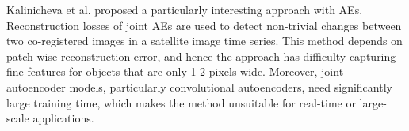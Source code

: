 \documentclass[journal,article,submit,pdftex,moreauthors]{Definitions/mdpi}
\begin{document}
Kalinicheva et al. \cite{Kalinicheva2019} proposed a particularly interesting approach with AEs. Reconstruction losses of joint AEs are used to detect non-trivial changes between two co-registered images in a satellite image time series. This method depends on patch-wise reconstruction error, and hence the approach has difficulty capturing fine features for objects that are only 1-2 pixels wide. Moreover, joint autoencoder models, particularly convolutional autoencoders, need significantly large training time, which makes the method unsuitable for real-time or large-scale applications. 



\end{document}
